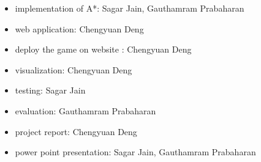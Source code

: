 \begin{itemize}
\begin{itemize}
	\item{implementation of A*: }
	Sagar Jain, Gauthamram Prabaharan
	\item{web application: }
	Chengyuan Deng
	\item{deploy the game on website : }
	Chengyuan Deng
    \item{visualization: }
    Chengyuan Deng
    \item{testing: }
    Sagar Jain
    \item{evaluation: }
    Gauthamram Prabaharan
    \item{project report: }
    Chengyuan Deng
    \item{power point presentation: }
    Sagar Jain, Gauthamram Prabaharan
	\end{itemize}
\end{itemize}

